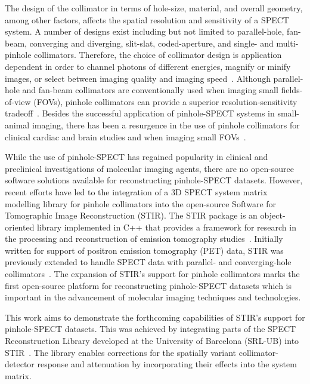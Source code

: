 \documentclass[utf8]{FrontiersinVancouver}
\begin{document}
The design of the collimator in terms of hole-size, material, and overall geometry, among other factors, affects the spatial resolution and sensitivity of a SPECT system. A number of designs exist including but not limited to parallel-hole, fan-beam, converging and diverging, slit-slat, coded-aperture, and single- and multi-pinhole collimators. Therefore, the choice of collimator design is application dependent in order to channel photons of different energies, magnify or minify images, or select between imaging quality and imaging speed~\citep{van_mullekom_group_collimators_2021}. Although parallel-hole and fan-beam collimators are conventionally used when imaging small fields-of-view (FOVs), pinhole collimators can provide a superior resolution-sensitivity tradeoff~\citep{islamian_advances_2015}. Besides the successful application of pinhole-SPECT systems in small-animal imaging, there has been a resurgence in the use of pinhole collimators for clinical cardiac and brain studies and when imaging small FOVs~\citep{ozsahin_clinical_2020}.

While the use of pinhole-SPECT has regained popularity in clinical and preclinical investigations of molecular imaging agents, there are no open-source software solutions available for reconstructing pinhole-SPECT datasets.  However, recent efforts have led to the integration of a 3D SPECT system matrix modelling library for pinhole collimators into the open-source Software for Tomographic Image Reconstruction (STIR). The STIR package is an object-oriented library implemented in C++ that provides a framework for research in the processing and reconstruction of emission tomography studies~\citep{thielemans_stir_2012}. Initially written for support of positron emission tomography (PET) data, STIR was previously extended to handle SPECT data with parallel- and converging-hole collimators~\citep{marti_fuster_integration_2013, marti_fuster_evaluation_2013}. The expansion of STIR's support for pinhole collimators marks the first open-source platform for reconstructing pinhole-SPECT datasets which is important in the advancement of molecular imaging techniques and technologies. 


This work aims to demonstrate the forthcoming capabilities of STIR's support for pinhole-SPECT datasets. This was achieved by integrating parts of the SPECT Reconstruction Library developed at the University of Barcelona (SRL-UB) into STIR~\citep{falcon_metodos_1999, cot_absolute_2005, pareto_geometrical_2002, pareto_iterative_2003}. The library enables corrections for the spatially variant collimator-detector response and attenuation by incorporating their effects into the system matrix.
\end{document}

